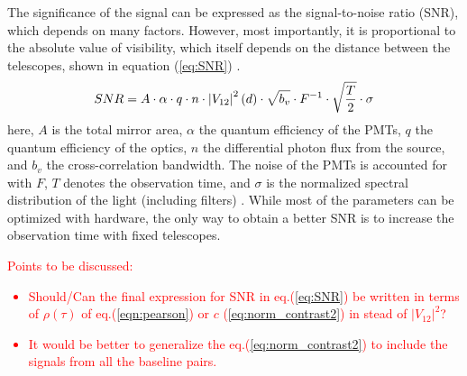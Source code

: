 The significance of the signal can be expressed as the signal-to-noise ratio (SNR), which depends on many factors. However, most importantly, it is proportional to the absolute value of visibility, which itself depends on the distance between the telescopes, shown in equation (\ref{eq:SNR}) \cite{acciari2020optical}.  
\begin{equation}
	SNR = A \cdot \alpha \cdot q \cdot n \cdot \left|V_{12}\right|^{2}(d) \cdot \sqrt{b_v} \cdot F^{-1} \cdot \sqrt{\frac{T}{2}} \cdot \sigma
	\label{eq:SNR}
\end{equation}
here, $A$ is the total mirror area, $\alpha$ the quantum efficiency of the PMTs, $q$ the quantum efficiency of the optics, $n$ the differential photon flux from the source, and $b_v$ the cross-correlation bandwidth. The noise of the PMTs is accounted for with $F$, $T$ denotes the observation time, and $\sigma$ is the normalized spectral distribution of the light (including filters) \cite{acciari2020optical}. While most of the parameters can be optimized with hardware, the only way to obtain a better SNR is to increase the observation time with fixed telescopes.  
\textcolor{red}{Points to be discussed: 
\begin{itemize}
\item{Should/Can the final expression for SNR in eq.(\ref{eq:SNR}) be written in terms of $\rho(\tau)$ of eq.(\ref{eqn:pearson}) or $c$ (\ref{eq:norm_contrast2}) in stead of $\vert V_{12}\vert^2$?}
\item{It would be better to generalize the eq.(\ref{eq:norm_contrast2}) to include the signals from all the baseline pairs.}
\end{itemize}}
